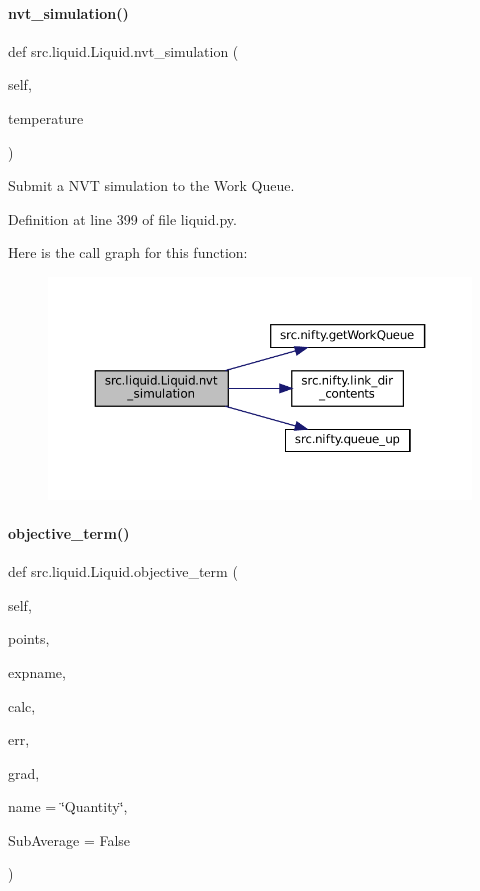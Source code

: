 \paragraph{\texorpdfstring{nvt\+\_\+simulation()}{nvt\_simulation()}}
{\footnotesize\ttfamily def src.\+liquid.\+Liquid.\+nvt\+\_\+simulation (\begin{DoxyParamCaption}\item[{}]{self,  }\item[{}]{temperature }\end{DoxyParamCaption})}



Submit a N\+VT simulation to the Work Queue. 



Definition at line 399 of file liquid.\+py.

Here is the call graph for this function\+:
\nopagebreak
\begin{figure}[H]
\begin{center}
\leavevmode
\includegraphics[width=350pt]{classsrc_1_1liquid_1_1Liquid_aadcc3367e376135de20c3e1dc60d6e1e_cgraph}
\end{center}
\end{figure}
\mbox{\label{classsrc_1_1liquid_1_1Liquid_ac5a5a9186569e177bf69563dd2b08e80}} 
\paragraph{\texorpdfstring{objective\+\_\+term()}{objective\_term()}}
{\footnotesize\ttfamily def src.\+liquid.\+Liquid.\+objective\+\_\+term (\begin{DoxyParamCaption}\item[{}]{self,  }\item[{}]{points,  }\item[{}]{expname,  }\item[{}]{calc,  }\item[{}]{err,  }\item[{}]{grad,  }\item[{}]{name = {\ttfamily \char`\"{}Quantity\char`\"{}},  }\item[{}]{Sub\+Average = {\ttfamily False} }\end{DoxyParamCaption})}



